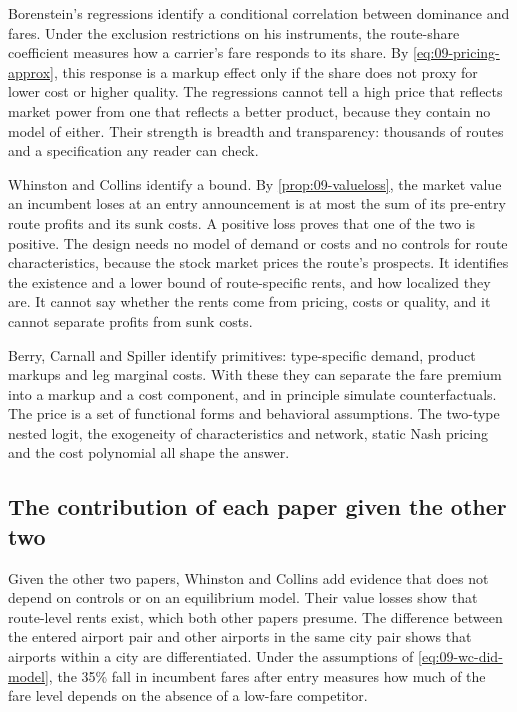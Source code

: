 Borenstein's regressions identify a conditional correlation between dominance and fares. Under the exclusion
restrictions on his instruments, the route-share coefficient measures how a carrier's fare responds to its
share. By \eqref{eq:09-pricing-approx}, this response is a markup effect only if the share does not proxy for
lower cost or higher quality. The regressions cannot tell a high price that reflects market power from one
that reflects a better product, because they contain no model of either. Their strength is breadth and
transparency: thousands of routes and a specification any reader can check.

Whinston and Collins identify a bound. By \cref{prop:09-valueloss}, the market value an incumbent loses at an
entry announcement is at most the sum of its pre-entry route profits and its sunk costs. A positive loss
proves that one of the two is positive. The design needs no model of demand or costs and no controls for
route characteristics, because the stock market prices the route's prospects. It identifies the existence and
a lower bound of route-specific rents, and how localized they are. It cannot say whether the rents come from
pricing, costs or quality, and it cannot separate profits from sunk costs.

Berry, Carnall and Spiller identify primitives: type-specific demand, product markups and leg marginal costs.
With these they can separate the fare premium into a markup and a cost component, and in principle simulate
counterfactuals. The price is a set of functional forms and behavioral assumptions. The two-type nested logit,
the exogeneity of characteristics and network, static Nash pricing and the cost polynomial all shape the
answer.

\subsection{The contribution of each paper given the other two}\label{sec:09-synthesis-contrib}

Given the other two papers, Whinston and Collins add evidence that does not depend on controls or on an
equilibrium model. Their value losses show that route-level rents exist, which both other papers presume. The
difference between the entered airport pair and other airports in the same city pair shows that airports
within a city are differentiated. Under the assumptions of \eqref{eq:09-wc-did-model}, the 35\% fall in
incumbent fares after entry measures how much of the fare level depends on the absence of a low-fare
competitor.

